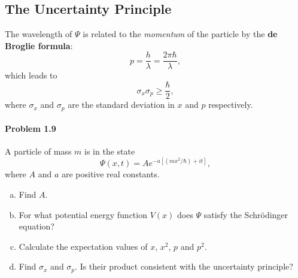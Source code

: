 \documentclass{article}
\begin{document}
\subsection{The Uncertainty Principle}

The wavelength of $\Psi$ is related to the \emph{momentum} of the particle by
the \textbf{de Broglie formula}: \begin{equation}
  p = \frac{h}{\lambda} = \frac{2\pi\hbar}{\lambda}, \label{eq:de-brog}
\end{equation} which leads to \begin{equation}
  \sigma_x\sigma_p \geq \frac{\hbar}{2},
\end{equation} where $\sigma_x$ and $\sigma_p$ are the standard deviation in
$x$ and $p$ respectively.

\paragraph{Problem 1.9} A particle of mass $m$ is in the state
\begin{equation*}
  \Psi(x, t) = Ae^{-a[(mx^2/\hbar) + it]},
  \end{equation*} where $A$ and $a$ are positive real constants.
\begin{enumerate}[(a)]
  \item Find $A$.
  \item For what potential energy function $V(x)$ does $\Psi$ satisfy the
    Schr\"{o}dinger equation?
  \item Calculate the expectation values of $x$, $x^2$, $p$ and $p^2$.
  \item Find $\sigma_x$ and $\sigma_p$. Is their product consistent with the
    uncertainty principle?
\end{enumerate}
\end{document}
